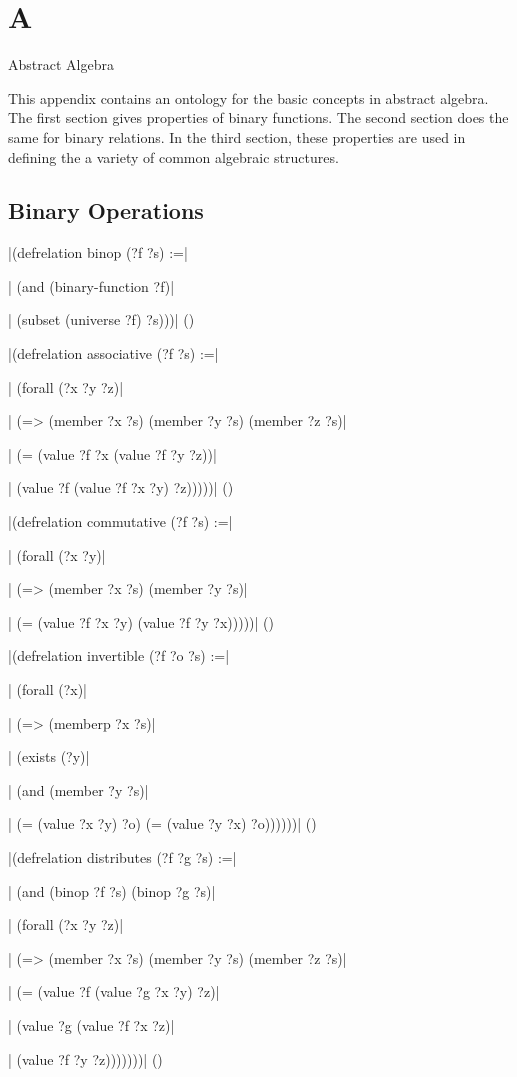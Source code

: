 \vfill\eject

\chapter{A}{Abstract Algebra}

This appendix contains an ontology for the basic concepts in abstract
algebra.  The first section gives properties of binary functions. 
The second section does the same for binary relations.  In the third
section, these properties are used in defining the a variety of common algebraic
structures.

\section{Binary Operations}

\verbatim|(defrelation binop (?f ?s) :=|\par
\verbatim|  (and (binary-function ?f)|\par
\verbatim|       (subset (universe ?f) ?s)))|
\hfill(\equation)\par
\bigskip
\verbatim|(defrelation associative (?f ?s) :=|\par
\verbatim|  (forall (?x ?y ?z)|\par
\verbatim|    (=> (member ?x ?s) (member ?y ?s) (member ?z ?s)|\par
\verbatim|        (= (value ?f ?x (value ?f ?y ?z))|\par
\verbatim|           (value ?f (value ?f ?x ?y) ?z)))))|
\hfill(\equation)\par
\bigskip
\verbatim|(defrelation commutative (?f ?s) :=|\par
\verbatim|  (forall (?x ?y)|\par
\verbatim|    (=> (member ?x ?s) (member ?y ?s)|\par
\verbatim|        (= (value ?f ?x ?y) (value ?f ?y ?x)))))|
\hfill(\equation)\par
\bigskip
\verbatim|(defrelation invertible (?f ?o ?s) :=|\par
\verbatim|  (forall (?x)|\par
\verbatim|    (=> (memberp ?x ?s)|\par
\verbatim|        (exists (?y)|\par
\verbatim|          (and (member ?y ?s)|\par
\verbatim|               (= (value ?x ?y) ?o) (= (value ?y ?x) ?o))))))|
\hfill(\equation)\par
\bigskip
\verbatim|(defrelation distributes (?f ?g ?s) :=|\par
\verbatim|  (and (binop ?f ?s) (binop ?g ?s)|\par
\verbatim|       (forall (?x ?y ?z)|\par
\verbatim|         (=> (member ?x ?s) (member ?y ?s) (member ?z ?s)|\par
\verbatim|             (= (value ?f (value ?g ?x ?y) ?z)|\par
\verbatim|                (value ?g (value ?f ?x ?z)|\par
\verbatim|                          (value ?f ?y ?z)))))))|
\hfill(\equation)\par
\bigskip

